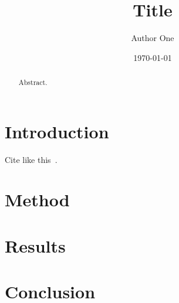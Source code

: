 \documentclass[11pt]{article}
\title{Title}
\author{Author One}
\date{\today}
\begin{document}
\maketitle
\begin{abstract}
Abstract.
\end{abstract}
\section{Introduction}
Cite like this~\cite{example2026}.
\section{Method}
\section{Results}
\section{Conclusion}


\end{document}
